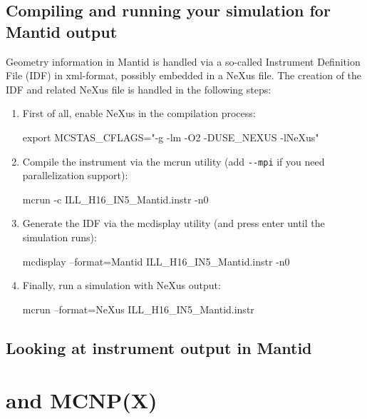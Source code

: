 \subsection{Compiling and running your simulation for Mantid output}
Geometry information in Mantid is handled via a so-called Instrument
Definition File (IDF) in xml-format, possibly embedded in a NeXus
file. The creation of the IDF and related NeXus file is handled in the
following steps:
\begin{enumerate}
\item First of all, enable NeXus in the compilation process:
 \begin{mcstas} 
   export MCSTAS_CFLAGS="-g -lm -O2 -DUSE_NEXUS -lNeXus"
 \end{mcstas}
\item Compile the instrument via the mcrun utility (add \verb+--mpi+
  if you need parallelization support):
 \begin{mcstas} 
   mcrun -c ILL_H16_IN5_Mantid.instr -n0
 \end{mcstas}
\item Generate the IDF via the mcdisplay utility (and press enter
  until the simulation runs):
 \begin{mcstas} 
   mcdisplay --format=Mantid ILL_H16_IN5_Mantid.instr -n0
 \end{mcstas}
\item Finally, run a simulation with NeXus output:
 \begin{mcstas} 
   mcrun --format=NeXus ILL_H16_IN5_Mantid.instr 
 \end{mcstas} 
\end{enumerate}

\subsection{Looking at instrument output in Mantid}




\section{\MCS and MCNP(X)}
